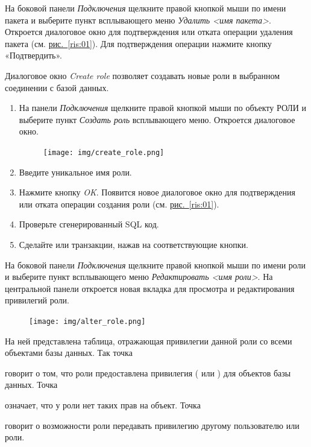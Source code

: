 На боковой панели \textit{Подключения} щелкните правой кнопкой мыши по имени пакета и выберите пункт всплывающего меню \textit{Удалить <имя пакета>}. Откроется  диалоговое окно для подтверждения или отката операции удаления пакета (см. \hyperref[ris:01]{рис.~\ref{ris:01}}). Для подтверждения операции нажмите кнопку «Подтвердить».



Диалоговое окно \textit{Create role} позволяет создавать новые роли в выбранном соединении с базой данных.

\begin{enumerate}[leftmargin=26pt]
	\item На панели \textit{Подключения} щелкните правой кнопкой мыши по объекту РОЛИ и выберите пункт \textit{Создать роль} всплывающего меню. Откроется диалоговое окно.
	\begin{figure}[H]
		\centering
		\texttt{[image: img/create\_role.png]}
	\end{figure}
	\item Введите уникальное имя роли.
	\item Нажмите кнопку \textit{OK}. Появится новое диалоговое окно для подтверждения или отката операции создания роли (см. \hyperref[ris:01]{рис.~\ref{ris:01}}).
	\item Проверьте сгенерированный SQL код.
	\item Сделайте  или  транзакции, нажав на соответствующие кнопки.
\end{enumerate}

На боковой панели \textit{Подключения} щелкните правой кнопкой мыши по имени роли и выберите пункт всплывающего меню \textit{Редактировать <имя роли>}. На центральной панели откроется новая вкладка для просмотра и редактирования привилегий роли. 	

\begin{figure}[H]
	\centering
	\texttt{[image: img/alter\_role.png]}
\end{figure}

На ней представлена таблица, отражающая привилегии данной роли со всеми объектами базы данных. Так точка  говорит о том, что роли предоставлена привилегия ( или ) для объектов базы
данных. Точка   означает, что у роли нет таких прав на объект. Точка  говорит о возможности роли передавать привилегию другому пользователю или роли. 

